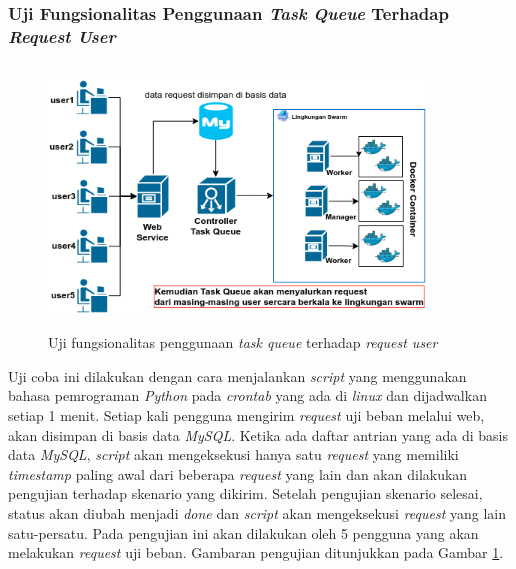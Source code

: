 		\subsubsection{Uji Fungsionalitas Penggunaan \textit{Task Queue} Terhadap \textit{Request User}} \label{quuuueue}
			\begin{figure}[H]
				\centering
				\includegraphics[width=10cm,height=7cm]{Images/C-5/taskqueue.png}
				\caption{Uji fungsionalitas penggunaan \textit{task queue} terhadap \textit{request user}}
				\label{gambartaskqueue}
			\end{figure}
			Uji coba ini dilakukan dengan cara menjalankan \textit{script} yang menggunakan bahasa pemrograman \textit{Python} pada \textit{crontab} yang ada di \textit{linux} dan dijadwalkan setiap 1 menit. Setiap kali pengguna mengirim \textit{request} uji beban melalui web, akan disimpan di basis data \textit{MySQL}. Ketika ada daftar antrian yang ada di basis data \textit{MySQL}, \textit{script} akan mengeksekusi hanya satu \textit{request} yang memiliki \textit{timestamp} paling awal dari beberapa \textit{request} yang lain dan akan dilakukan pengujian terhadap skenario yang dikirim. Setelah pengujian skenario selesai, status akan diubah menjadi \textit{done} dan \textit{script} akan mengeksekusi \textit{request} yang lain satu-persatu. Pada pengujian ini akan dilakukan oleh 5 pengguna yang akan melakukan \textit{request} uji beban. Gambaran pengujian ditunjukkan pada Gambar \ref{gambartaskqueue}.
			
		
